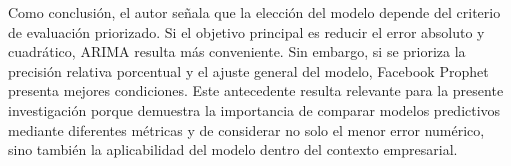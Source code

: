 Como conclusión, el autor señala que la elección del modelo depende del criterio de evaluación priorizado. Si el objetivo principal es reducir el error absoluto y cuadrático, ARIMA resulta más conveniente. Sin embargo, si se prioriza la precisión relativa porcentual y el ajuste general del modelo, Facebook Prophet presenta mejores condiciones. Este antecedente resulta relevante para la presente investigación porque demuestra la importancia de comparar modelos predictivos mediante diferentes métricas y de considerar no solo el menor error numérico, sino también la aplicabilidad del modelo dentro del contexto empresarial.

%

